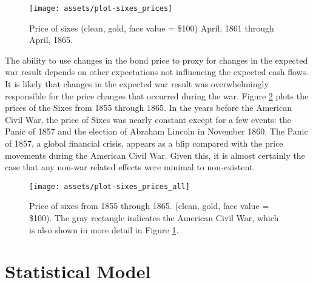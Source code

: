 \documentclass[11pt, oneside, article]{memoir}
\begin{document}
\begin{figure}[htpb]
  \centering
  \texttt{[image: assets/plot-sixes\_prices]}
  \caption{Price of sixes (clean, gold, face value = \$100) April, 1861 through April, 1865.}
  \label{fig:sixes_price}
\end{figure}

The ability to use changes in the bond price to proxy for changes in the expected war result depends on other expectations not influencing the expected cash flows.
It is likely that changes in the expected war result was overwhelmingly responsible for the price changes that occurred during the war.
Figure \ref{fig:sixes_price_all} plots the prices of the Sixes from 1855 through 1865.
In the years before the American Civil War, the price of Sixes was nearly constant except for a few events: the Panic of 1857 and the election of Abraham Lincoln in November 1860.
The Panic of 1857, a global financial crisis, appears as a blip compared with the price movements during the American Civil War.
Given this, it is almost certainly the case that any non-war related effects were minimal to non-existent.

\begin{figure}[htpb]
  \centering
  \texttt{[image: assets/plot-sixes\_prices\_all]}
  \caption{Price of sixes from 1855 through 1865. (clean, gold, face value = \$100). 
  The gray rectangle indicates the American Civil War, which is also shown in more detail in Figure \ref{fig:sixes_price}.}
  \label{fig:sixes_price_all}
\end{figure}



\section{Statistical Model}
\label{sec:model}
\end{document}
